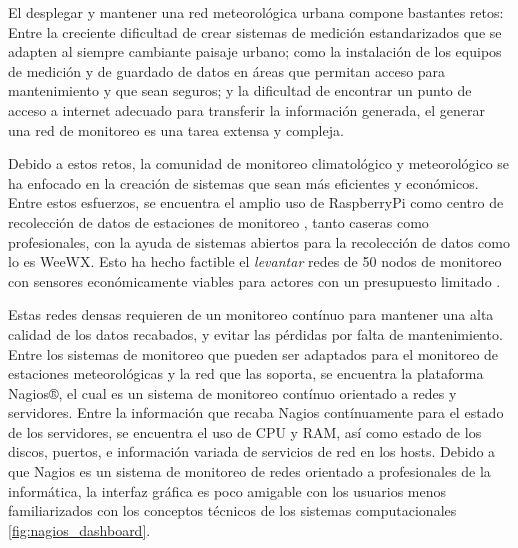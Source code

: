 El desplegar y mantener una red meteorológica urbana compone bastantes retos: Entre la creciente dificultad de crear sistemas de medición estandarizados que se adapten al siempre cambiante paisaje urbano; como la instalación de los equipos de medición y de guardado de datos en áreas que permitan acceso para mantenimiento y que sean seguros; y la dificultad de encontrar un punto de acceso a internet adecuado para transferir la información generada, el generar una red de monitoreo es una tarea extensa y compleja.

Debido a estos retos, la comunidad de monitoreo climatológico y meteorológico se ha enfocado en la creación de sistemas que sean más eficientes y económicos. Entre estos esfuerzos, se encuentra el amplio uso de RaspberryPi como centro de recolección de datos de estaciones de monitoreo \cite{rpi_weataher_station}, tanto caseras como profesionales, con la ayuda de sistemas abiertos para la recolección de datos como lo es WeeWX. Esto ha hecho factible el \textit{levantar} redes de 50 nodos de monitoreo con sensores económicamente viables para actores con un presupuesto limitado \cite{monitoreo_raspberry_nagios}.



Estas redes densas requieren de un monitoreo contínuo para mantener una alta calidad de los datos recabados, y evitar las pérdidas por falta de mantenimiento. Entre los sistemas de monitoreo que pueden ser adaptados para el monitoreo de estaciones meteorológicas y la red que las soporta, se encuentra la plataforma Nagios®, el cual es un sistema de monitoreo contínuo orientado a redes y servidores. Entre la información que recaba Nagios contínuamente para el estado de los servidores, se encuentra el uso de CPU y RAM, así como estado de los discos, puertos, e información variada de servicios de red en los hosts. Debido a que Nagios es un sistema de monitoreo de redes orientado a profesionales de la informática, la interfaz gráfica es poco amigable con los usuarios menos familiarizados con los conceptos técnicos de los sistemas computacionales \ref{fig:nagios_dashboard}.

